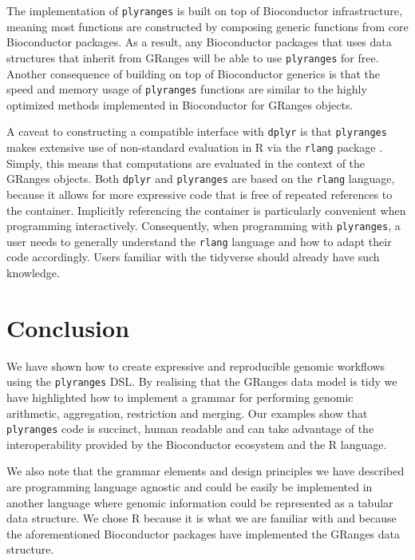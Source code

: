 \documentclass[]{article}
\begin{document}
The implementation of \texttt{plyranges} is built on top of Bioconductor
infrastructure, meaning most functions are constructed by composing
generic functions from core Bioconductor packages. As a result, any
Bioconductor packages that uses data structures that inherit from
GRanges will be able to use \texttt{plyranges} for free. Another
consequence of building on top of Bioconductor generics is that the
speed and memory usage of \texttt{plyranges} functions are similar to
the highly optimized methods implemented in Bioconductor for GRanges
objects.

A caveat to constructing a compatible interface with \texttt{dplyr} is
that \texttt{plyranges} makes extensive use of non-standard evaluation
in R via the \texttt{rlang} package \cite{R-rlang}. Simply, this means
that computations are evaluated in the context of the GRanges objects.
Both \texttt{dplyr} and \texttt{plyranges} are based on the
\texttt{rlang} language, because it allows for more expressive code that
is free of repeated references to the container. Implicitly referencing
the container is particularly convenient when programming interactively.
Consequently, when programming with \texttt{plyranges}, a user needs to
generally understand the \texttt{rlang} language and how to adapt their
code accordingly. Users familiar with the tidyverse should already have
such knowledge.

\section{Conclusion}\label{conclusion}

We have shown how to create expressive and reproducible genomic
workflows using the \texttt{plyranges} DSL. By realising that the
GRanges data model is tidy we have highlighted how to implement a
grammar for performing genomic arithmetic, aggregation, restriction and
merging. Our examples show that \texttt{plyranges} code is succinct,
human readable and can take advantage of the interoperability provided
by the Bioconductor ecosystem and the R language.

We also note that the grammar elements and design principles we have
described are programming language agnostic and could be easily be
implemented in another language where genomic information could be
represented as a tabular data structure. We chose R because it is what
we are familiar with and because the aforementioned Bioconductor
packages have implemented the GRanges data structure.
\end{document}
